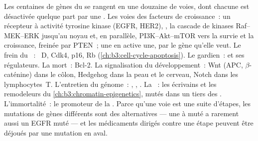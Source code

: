 \begin{proposition}\label{prop:b3:cancer-biology:pathways}
Les centaines de gènes du  se rangent en une douzaine de voies,
dont chacune est désactivée quelque part par une . Les voies des
facteurs de croissance~: un récepteur à activité tyrosine kinase (EGFR,
HER2), , la cascade de kinases Raf--MEK--ERK jusqu'au noyau et, en
parallèle, PI3K--Akt--mTOR vers la survie et la croissance, freinée par
PTEN~; une  en active une, par le gène qu'elle veut. Le frein du
~: ~D, Cdk4, p16, Rb
(\cref{ch:b3:cell-cycle-apoptosis}). Le gardien~:  et ses
régulateurs. La mort~: Bcl-2. La signalisation du développement~: Wnt
(APC, $\beta$-caténine) dans le côlon, Hedgehog dans la peau et le
cerveau, Notch dans les lymphocytes~T. L'entretien du génome~:
, , . La ~: les
écrivains et les remodeleurs du
\cref{ch:b3:chromatin-epigenetics}, mutés dans un tiers des .
L'immortalité~: le promoteur de la . Parce qu'une voie est
une suite d'étapes, les mutations de gènes différents sont des
alternatives --- une  à  muté a rarement aussi un EGFR muté
--- et les médicaments dirigés contre une étape peuvent être déjoués
par une mutation en aval.
\end{proposition}


